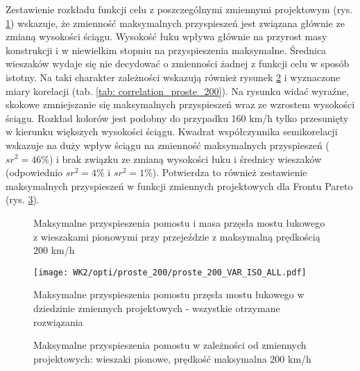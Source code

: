 Zestawienie rozkładu funkcji celu z poszczególnymi zmiennymi projektowym (rys. \ref{fig:wk2_opti_proste_200_variables}) wskazuje, że zmienność maksymalnych przyspieszeń jest związana głównie ze zmianą wysokości ściągu. Wysokość łuku wpływa głównie na przyrost masy konstrukcji i w niewielkim stopniu na przyspieszenia maksymalne. Średnica wieszaków wydaje się nie decydować o zmienności żadnej z funkcji celu w sposób istotny. Na taki charakter zależności wskazują również rysunek \ref{fig:wk2_opti_proste_200_vars_all} i wyznaczone miary korelacji (tab. \ref{tab: correlation_proste_200}). Na rysunku widać wyraźne, skokowe zmniejszanie się maksymalnych przyspieszeń wraz ze wzrostem wysokości ściągu. Rozkład kolorów jest podobny do przypadku 160 km/h tylko przesunięty w kierunku większych wysokości ściągu. Kwadrat współczynnika semikorelacji wskazuje na duży wpływ ściągu na zmienność maksymalnych przyspieszeń ($sr^2=46\%$) i brak związku ze zmianą wysokości łuku i średnicy wieszaków (odpowiednio $sr^2=4\%$ i $sr^2=1\%$). Potwierdza to również zestawienie maksymalnych przyspieszeń w funkcji zmiennych projektowych dla Frontu Pareto (rys. \ref{fig:wk2_opti_proste_200_var_2d}). 

\begin{figure}[hbt!]
	\centering
	\captionsetup{justification=centering}
	\caption{Maksymalne przyspieszenia pomostu i masa przęsła mostu łukowego z wieszakami pionowymi przy przejeździe z maksymalną prędkością 200 km/h}
	\label{fig:wk2_opti_proste_200_variables}
\end{figure}

\begin{figure}[hbt!]
	\centering
	\texttt{[image: WK2/opti/proste\_200/proste\_200\_VAR\_ISO\_ALL.pdf]}
	\captionsetup{justification=centering}
	\caption{Maksymalne przyspieszenia pomostu przęsła mostu łukowego w dziedzinie zmiennych projektowych - wszystkie otrzymane rozwiązania}
	\label{fig:wk2_opti_proste_200_vars_all}
\end{figure}
\begin{figure}[hbt!]
	\centering
	\captionsetup{justification=centering}
	\caption{Maksymalne przyspieszenia pomostu w zależności od zmiennych projektowych: wieszaki pionowe, prędkość maksymalna 200 km/h}
	\label{fig:wk2_opti_proste_200_var_2d}
\end{figure}


